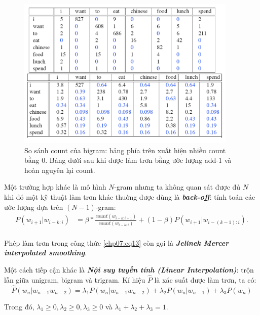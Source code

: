 \begin{figure}[H]
    \centering
    \includegraphics[width=10.5cm]{books/artificial-neural-network/chapter07/figure-sec12/smoothing.png}
    \caption{So sánh count của bigram: bảng phía trên xuất hiện nhiều count bằng $0$. Bảng dưới sau khi được làm trơn bằng ước lượng add-1 và hoàn nguyên lại count.}
    \label{fig:smoothing}
\end{figure}

Một trường hợp khác là mô hình $N$-gram nhưng ta không quan sát được đủ $N$ khi đó một kỹ thuật làm trơn khác thuờng được dùng là \textbf{\textit{back-off}}: tính toán các ước lượng dựa trên $(N-1)$-gram:
\begin{equation}
\label{chp07:eq13}
\begin{split}
P(w_{i+1}|w_{i-k:i})&=\beta*\frac{count(w_{i-k:i+1})}{count(w_{i-k:i})}+(1-\beta)P(w_{i+1}|w_{i-(k-1):i}).\\
\end{split}
\end{equation}

Phép làm trơn trong công thức \ref{chp07:eq13} còn gọi là \textbf{\textit{Jelinek Mercer interpolated smoothing}}.

Một cách tiếp cận khác là \textbf{\textit{Nội suy tuyến tính (Linear Interpolation)}}: trộn lẫn giữa unigram, bigram và trigram. Kí hiệu $\hat{P}$ là xác suất được làm trơn, ta có:
$$\hat{P}(w_n|w_{n-1}w_{n-2})=\lambda_1 P(w_n|w_{n-1}w_{n-2})+\lambda_2 P(w_n|w_{n-1})+\lambda_3 P(w_n)$$

Trong đó, $\lambda_1 \geq 0,\lambda_2 \geq 0,\lambda_3 \geq 0$ và $\lambda_1 +\lambda_2 + \lambda_3 =1$.
